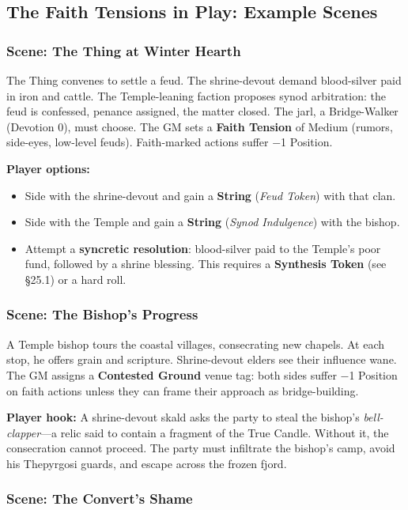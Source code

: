 \documentclass[11pt]{article}
\begin{document}
\subsection{The Faith Tensions in Play: Example Scenes}

\subsubsection{Scene: The Thing at Winter Hearth}

The Thing convenes to settle a feud. The shrine-devout demand blood-silver paid in iron and cattle. The Temple-leaning faction proposes synod arbitration: the feud is confessed, penance assigned, the matter closed. The jarl, a Bridge-Walker (Devotion 0), must choose. The GM sets a \textbf{Faith Tension} of Medium (rumors, side-eyes, low-level feuds). Faith-marked actions suffer −1 Position.

\textbf{Player options:}
\begin{itemize}
\item Side with the shrine-devout and gain a \textbf{String} (\textit{Feud Token}) with that clan.
\item Side with the Temple and gain a \textbf{String} (\textit{Synod Indulgence}) with the bishop.
\item Attempt a \textbf{syncretic resolution}: blood-silver paid to the Temple's poor fund, followed by a shrine blessing. This requires a \textbf{Synthesis Token} (see §25.1) or a hard roll.
\end{itemize}

\subsubsection{Scene: The Bishop's Progress}

A Temple bishop tours the coastal villages, consecrating new chapels. At each stop, he offers grain and scripture. Shrine-devout elders see their influence wane. The GM assigns a \textbf{Contested Ground} venue tag: both sides suffer −1 Position on faith actions unless they can frame their approach as bridge-building.

\textbf{Player hook:} A shrine-devout skald asks the party to steal the bishop's \textit{bell-clapper}---a relic said to contain a fragment of the True Candle. Without it, the consecration cannot proceed. The party must infiltrate the bishop's camp, avoid his Thepyrgosi guards, and escape across the frozen fjord.

\subsubsection{Scene: The Convert's Shame}
\end{document}

